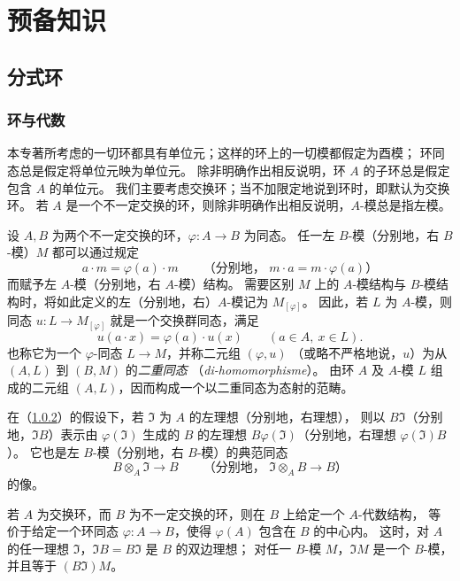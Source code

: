 \renewcommand{\B}{\mathfrak B}
\setcounter{chapter}{-1}
\chapter{预备知识}

\section{分式环}\hypertarget{heading:0:1}{}
\setcounter{subsection}{-1}
\subsection{环与代数}\hypertarget{heading:0:1.0}{}

本专著所考虑的一切环都具有单位元；这样的环上的一切模都假定为酉模；
环同态总是假定将单位元映为单位元。
除非明确作出相反说明，环 $A$ 的子环总是假定包含 $A$ 的单位元。
我们主要考虑交换环；当不加限定地说到环时，即默认为交换环。
若 $A$ 是一个不一定交换的环，则除非明确作出相反说明，$A$-模总是指左模。

设 $A,B$ 为两个不一定交换的环，$\varphi\colon A\to B$ 为同态。
任一左 $B$-模（分别地，右 $B$-模）$M$ 都可以通过规定
\[
 a\cdot m=\varphi(a)\cdot m
 \qquad\text{（分别地， }m\cdot a=m\cdot\varphi(a)\text{）}
\]
而赋予左 $A$-模（分别地，右 $A$-模）结构。
需要区别 $M$ 上的 $A$-模结构与 $B$-模结构时，将如此定义的左（分别地，右）$A$-模记为 $M_{[\varphi]}$。
因此，若 $L$ 为 $A$-模，则同态 $u\colon L\to M_{[\varphi]}$ 就是一个交换群同态，满足
\[
 u(a\cdot x)=\varphi(a)\cdot u(x)\qquad(a\in A,\ x\in L).
\]
也称它为一个 $\varphi$-同态 $L\to M$，并称二元组 $(\varphi,u)$
（或略不严格地说，$u$）为从 $(A,L)$ 到 $(B,M)$ 的\emph{二重同态}
（\textit{di-homomorphisme}）。
由环 $A$ 及 $A$-模 $L$ 组成的二元组 $(A,L)$，因而构成一个以二重同态为态射的范畴。

在（\hyperlink{para:0:1.0.2}{1.0.2}）的假设下，若 $\mathfrak I$ 为 $A$ 的左理想（分别地，右理想），
则以 $B\mathfrak I$（分别地，$\mathfrak I B$）表示由 $\varphi(\mathfrak I)$ 生成的
$B$ 的左理想 $B\varphi(\mathfrak I)$（分别地，右理想 $\varphi(\mathfrak I)B$）。
它也是左 $B$-模（分别地，右 $B$-模）的典范同态
\[
 B\otimes_A\mathfrak I\longrightarrow B
 \qquad\text{（分别地， }\mathfrak I\otimes_A B\longrightarrow B\text{）}
\]
的像。

若 $A$ 为交换环，而 $B$ 为不一定交换的环，则在 $B$ 上给定一个 $A$-代数结构，
等价于给定一个环同态 $\varphi\colon A\to B$，使得 $\varphi(A)$ 包含在 $B$ 的中心内。
这时，对 $A$ 的任一理想 $\mathfrak I$，$\mathfrak I B=B\mathfrak I$ 是 $B$ 的双边理想；
对任一 $B$-模 $M$，$\mathfrak I M$ 是一个 $B$-模，并且等于 $(B\mathfrak I)M$。

